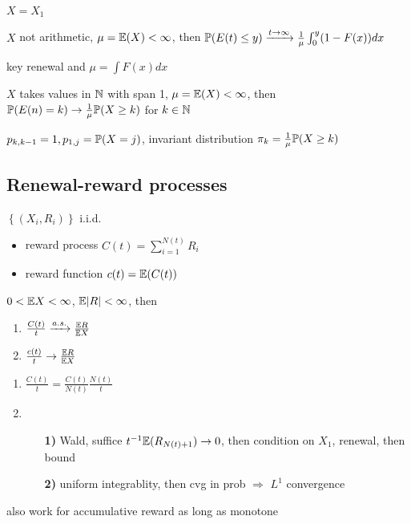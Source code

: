 \begin{setting}
    $X = X_1$
\end{setting}

\begin{thm}
    $X$ not arithmetic, $\mu = \mathbb{E}(X) < \infty$, then $\mathbb{P}(E(t) \leq y) \xrightarrow{t \rightarrow \infty} \frac{1}{\mu} \int_0^y (1 - F(x)) dx$
\end{thm}
\begin{pf}
    key renewal and $\mu = \int F(x) dx$
\end{pf}

\begin{thm}
    $X$ takes values in $\mathbb{N}$ with span 1, $\mu = \mathbb{E}(X) < \infty$, then $\mathbb{P}(E(n) = k) \rightarrow \frac{1}{\mu}\mathbb{P}(X \geq k)$ for $k \in \mathbb{N}$
\end{thm}
\begin{pf}
    $p_{k, k-1} = 1, p_{1, j} = \mathbb{P}(X = j)$, invariant distribution $\pi_k = \frac{1}{\mu}\mathbb{P}(X \geq k)$
\end{pf}

\subsection{Renewal-reward processes}\label{subsec:renewal-reward-processes}

\begin{setting}
    $\left\{ (X_i, R_i) \right\}$ i.i.d.\
\end{setting}

\begin{itemize}
    \item reward process $C(t) = \sum^{N(t)}_{i=1} R_i$
    \item reward function $c(t) = \mathbb{E}(C(t))$
\end{itemize}

\begin{thm}
    $0 < \mathbb{E} X < \infty$, $\mathbb{E}|R| < \infty$, then
    \begin{enumerate}
        \item $\frac{C(t)}{t} \xrightarrow{a.s.} \frac{\mathbb{E} R}{\mathbb{E} X}$
        \item $\frac{c(t)}{t} \rightarrow \frac{\mathbb{E} R}{\mathbb{E} X}$
    \end{enumerate}
\end{thm}
\begin{pf}
    \begin{enumerate}
        \item $\frac{C(t)}{t} = \frac{C(t)}{N(t)} \frac{N(t)}{t}$
        \item
        \begin{enumerate}
            \item[\textbf{1)}] Wald, suffice $t^{-1} \mathbb{E}(R_{N(t) + 1}) \rightarrow 0$, then condition on $X_1$, renewal, then bound
            \item[\textbf{2)}] uniform integrablity, then cvg in prob $\Rightarrow$ $L^1$ convergence
        \end{enumerate}
    \end{enumerate}
\end{pf}

\begin{fact}
    also work for accumulative reward as long as monotone
\end{fact}







